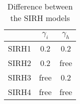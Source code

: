 
\begin{table}[ht]
\centering
\begin{tabular}{|c|c|c|}
\hline
 &$\gamma_i$ & $\gamma_h$ \\
\hline
SIRH1 & 0.2 & 0.2 \\
\hline
SIRH2 & 0.2 & free \\
\hline
SIRH3 & free & 0.2 \\
\hline
SIRH4 & free & free \\
\hline
\end{tabular}
\caption{Difference between the SIRH models}
\label{tab:sirh_models_parameters}
\end{table}